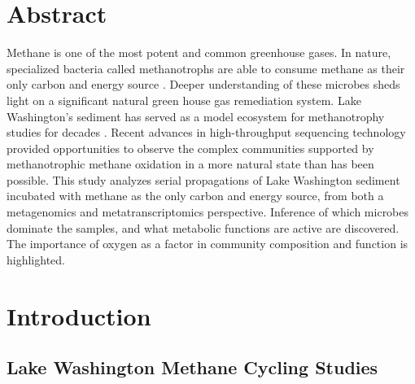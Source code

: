 
\section{Abstract}

Methane is one of the most potent and common greenhouse gases.
In nature, specialized bacteria called methanotrophs are able to consume methane as their only carbon and energy source \cite{murrell2009}.
Deeper understanding of these microbes sheds light on a significant natural green house gas remediation system.
Lake Washington's sediment has served as a model ecosystem for methanotrophy studies for decades \cite{auman2002, kalyuzhnaya2004, costello2002, kalyuzhnaya2011isolates, mctaggart2015, kalyuzhnaya2015}.
Recent advances in high-throughput sequencing technology provided opportunities to observe the complex communities supported by methanotrophic methane oxidation in a more natural state than has been possible.
This study analyzes serial propagations of Lake Washington sediment incubated with methane as the only carbon and energy source, from both a metagenomics and metatranscriptomics perspective.
Inference of which microbes dominate the samples, and what metabolic functions are active are discovered.
The importance of oxygen as a factor in community composition and function is highlighted.

\section{Introduction}
\subsection{Lake Washington Methane Cycling Studies}

